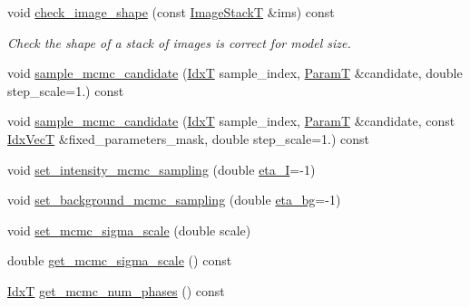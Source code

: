 \begin{DoxyCompactItemize}
void \hyperlink{classmappel_1_1ImageFormat1DBase_a8d5c0744643bf0bbbf30dd3122f98190}{check\+\_\+image\+\_\+shape} (const \hyperlink{classmappel_1_1ImageFormat1DBase_a81e3246d1c5c37ebf9077b7b5bd25a76}{Image\+StackT} \&ims) const 
\begin{DoxyCompactList}\small\item\em Check the shape of a stack of images is correct for model size. \end{DoxyCompactList}\item 
void \hyperlink{classmappel_1_1MCMCAdaptor1D_af99aecf740294e4945315a835ef5247a}{sample\+\_\+mcmc\+\_\+candidate} (\hyperlink{namespacemappel_ab17ec0f30b61ece292439d7ece81d3a8}{IdxT} sample\+\_\+index, \hyperlink{classmappel_1_1PointEmitterModel_a665ec6aea3aac139bb69a23c06d4b9a1}{ParamT} \&candidate, double step\+\_\+scale=1.) const 
\item 
void \hyperlink{classmappel_1_1MCMCAdaptor1D_af3e25b902a397fb5cbd2cbe32103d46f}{sample\+\_\+mcmc\+\_\+candidate} (\hyperlink{namespacemappel_ab17ec0f30b61ece292439d7ece81d3a8}{IdxT} sample\+\_\+index, \hyperlink{classmappel_1_1PointEmitterModel_a665ec6aea3aac139bb69a23c06d4b9a1}{ParamT} \&candidate, const \hyperlink{namespacemappel_ac63743dcd42180127307cd0e4ecdd784}{Idx\+VecT} \&fixed\+\_\+parameters\+\_\+mask, double step\+\_\+scale=1.) const 
\item 
void \hyperlink{classmappel_1_1MCMCAdaptor1D_ac70f768928859b1e9449b0ec1a141c4c}{set\+\_\+intensity\+\_\+mcmc\+\_\+sampling} (double \hyperlink{classmappel_1_1MCMCAdaptor1D_a5780d326be0c40e10d6c91777cfffbd3}{eta\+\_\+I}=-\/1)
\item 
void \hyperlink{classmappel_1_1MCMCAdaptor1D_ae79ee3845fbdd0e378f00eeebf8ccef1}{set\+\_\+background\+\_\+mcmc\+\_\+sampling} (double \hyperlink{classmappel_1_1MCMCAdaptor1D_af54c93421b8e298289cbb92743c6b3d5}{eta\+\_\+bg}=-\/1)
\item 
void \hyperlink{classmappel_1_1MCMCAdaptorBase_aa6b8eea136bf1f34f0c50bf8d1937a58}{set\+\_\+mcmc\+\_\+sigma\+\_\+scale} (double scale)
\item 
double \hyperlink{classmappel_1_1MCMCAdaptorBase_a9de5ee52bbf5c8fd3c1e3bd00836801a}{get\+\_\+mcmc\+\_\+sigma\+\_\+scale} () const 
\item 
\hyperlink{namespacemappel_ab17ec0f30b61ece292439d7ece81d3a8}{IdxT} \hyperlink{classmappel_1_1MCMCAdaptorBase_adb9997f1dc774f3a169c61cdb730a85f}{get\+\_\+mcmc\+\_\+num\+\_\+phases} () const 
\end{DoxyCompactItemize}
